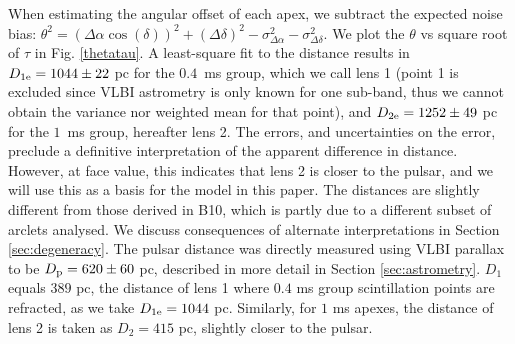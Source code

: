 \documentclass[useAMS,usenatbib]{mn2e}
\begin{document}
When estimating the angular offset of each apex,
we subtract the expected noise bias:
${\theta}^2=({\Delta\alpha}\cos(\delta))^2+({\Delta\delta})^2-\sigma^2_{\Delta\alpha}-\sigma^2_{\Delta\delta}$. 
We plot the $\theta$ vs square root of $\tau$ in Fig.
\ref{thetatau}.  A least-square fit to the distance results in
$D_{1{\rm e}}=1044\pm 22$ pc for the  $0.4$\ ms group, which we call
lens 1 (point 1 is excluded since VLBI astrometry is only known for
one sub-band, thus we cannot obtain the variance nor weighted mean for that point), and
$D_{2{\rm e}} = 1252 \pm 49$ pc for the $1$\ ms group, hereafter lens 2.
The errors, and uncertainties on the error, preclude a definitive
interpretation of the apparent difference in distance.  However, at face value, 
this indicates that lens 2 is closer to the pulsar, and we will
use this as a basis for the model in this paper.  
The distances are slightly different from those derived in
B10, which is partly due to a different subset
of arclets analysed.  We discuss
consequences of alternate interpretations in Section \ref{sec:degeneracy}.
The pulsar distance was directly measured using VLBI parallax to be
$D_{\rm p} = 620 \pm 60$ pc, described in more detail in Section \ref{sec:astrometry}.  
$D_{1}$ equals  $389$ pc, the distance of lens 1 where $0.4$ ms group scintillation points are refracted, as we take $D_{1{\rm e}}=1044$ pc.
Similarly, for $1$ ms apexes, the distance of lens 2 is taken as $D_2=415$ pc,
slightly closer to the pulsar.

\end{document}
